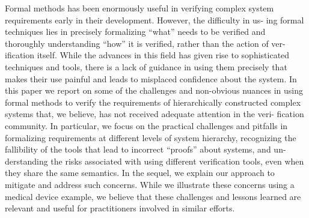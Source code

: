 %
%
%
%
%
%


\iffalse


Formal methods has been enormously useful in verifying complex
system requirements early in their development. However, the difficulty in us-
ing formal techniques lies in precisely formalizing “what” needs to be verified
and thoroughly understanding “how” it is verified, rather than the action of ver-
ification itself. While the advances in this field has given rise to sophisticated
techniques and tools, there is a lack of guidance in using them precisely that
makes their use painful and leads to misplaced confidence about the system.
In this paper we report on some of the challenges and non-obvious nuances in
using formal methods to verify the requirements of hierarchically constructed
complex systems that, we believe, has not received adequate attention in the veri-
fication community. In particular, we focus on the practical challenges and pitfalls
in formalizing requirements at different levels of system hierarchy, recognizing
the fallibility of the tools that lead to incorrect “proofs” about systems, and un-
derstanding the risks associated with using different verification tools, even when
they share the same semantics. In the sequel, we explain our approach to mitigate
and address such concerns. While we illustrate these concerns using a medical
device example, we believe that these challenges and lessons learned are relevant
and useful for practitioners involved in similar efforts.

